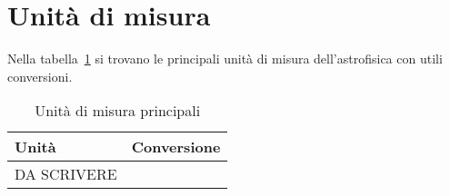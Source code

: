 \section{Unità di misura}\label{app:unità}
Nella tabella~\ref{apptab:unità} si trovano le principali unità di misura dell'astrofisica con utili conversioni.

\begin{table}
\caption{Unità di misura principali}
\label{apptab:unità}
\centering
\begin{tabular}{ll}
\toprule
Unità & Conversione \\
\midrule
DA SCRIVERE
\end{tabular}
\end{table}